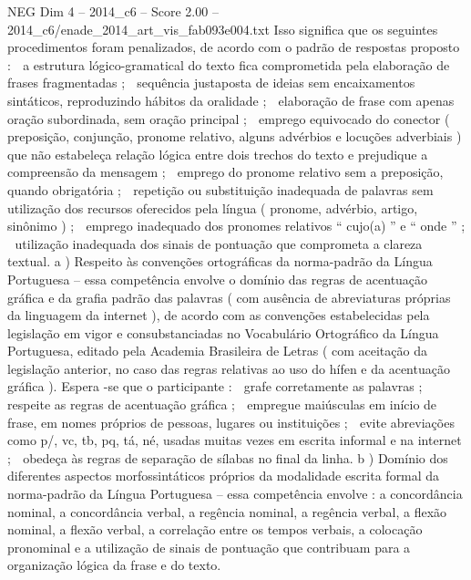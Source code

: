 \begin{textsample}{NEG Dim 4 – 2014\_c6 – Score 2.00 – 2014\_c6/enade\_2014\_art\_vis\_fab093e004.txt}
Isso significa que os seguintes procedimentos foram penalizados, de acordo com o padrão de respostas proposto :  a estrutura lógico-gramatical do texto fica comprometida pela elaboração de frases fragmentadas ;  sequência justaposta de ideias sem encaixamentos sintáticos, reproduzindo hábitos da oralidade ;  elaboração de frase com apenas oração subordinada, sem oração principal ;  emprego equivocado do conector ( preposição, conjunção, pronome relativo, alguns advérbios e locuções adverbiais ) que não estabeleça relação lógica entre dois trechos do texto e prejudique a compreensão da mensagem ;  emprego do pronome relativo sem a preposição, quando obrigatória ;  repetição ou substituição inadequada de palavras sem utilização dos recursos oferecidos pela língua ( pronome, advérbio, artigo, sinônimo ) ;  emprego inadequado dos pronomes relativos “ cujo(a) ” e “ onde ” ;  utilização inadequada dos sinais de pontuação que comprometa a clareza textual. a ) Respeito às convenções ortográficas da norma-padrão da Língua Portuguesa – essa competência envolve o domínio das regras de acentuação gráfica e da grafia padrão das palavras ( com ausência de abreviaturas próprias da linguagem da internet ), de acordo com as convenções estabelecidas pela legislação em vigor e consubstanciadas no Vocabulário Ortográfico da Língua Portuguesa, editado pela Academia Brasileira de Letras ( com aceitação da legislação anterior, no caso das regras relativas ao uso do hífen e da acentuação gráfica ).
Espera -se que o participante :  grafe corretamente as palavras ;  respeite as regras de acentuação gráfica ;  empregue maiúsculas em início de frase, em nomes próprios de pessoas, lugares ou instituições ;  evite abreviações como p/, vc, tb, pq, tá, né, usadas muitas vezes em escrita informal e na internet ;  obedeça às regras de separação de sílabas no final da linha. b ) Domínio dos diferentes aspectos morfossintáticos próprios da modalidade escrita formal da norma-padrão da Língua Portuguesa – essa competência envolve : a concordância nominal, a concordância verbal, a regência nominal, a regência verbal, a flexão nominal, a flexão verbal, a correlação entre os tempos verbais, a colocação pronominal e a utilização de sinais de pontuação que contribuam para a organização lógica da frase e do texto.

\end{textsample}
